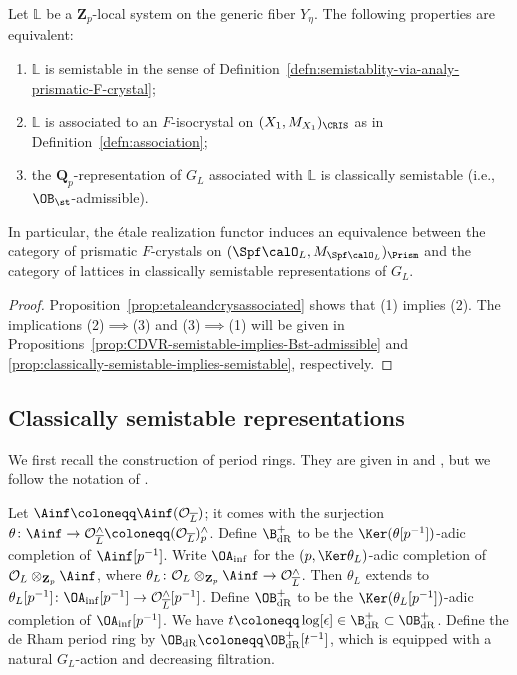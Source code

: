 \begin{thm} \label{thm:CDVR-semistable-notions-equivalent}
Let $\mathbb{L}$ be a $\mathbf{Z}_p$-local system on the generic fiber $Y_{\eta}$. The following properties are equivalent:
\begin{enumerate}
    \item $\mathbb{L}$ is semistable in the sense of Definition~\ref{defn:semistablity-via-analy-prismatic-F-crystal};
    \item $\mathbb{L}$ is associated to an $F$-isocrystal on $(X_1,M_{X_1})_{\CRIS}$ as in Definition~\ref{defn:association};
    \item the $\mathbf{Q}_p$-representation of $G_L$ associated with $\mathbb{L}$ is classically semistable (i.e., $\OB_{\st}$-admissible).
\end{enumerate}
In particular, the \'etale realization functor induces an equivalence between the category of prismatic $F$-crystals on $(\Spf \calO_L, M_{\Spf \calO_L})_\Prism$ and the category of lattices in classically semistable representations of $G_L$.
\end{thm}

\begin{proof}
Proposition~\ref{prop:etaleandcrysassociated} shows that (1) implies (2). The implications (2)$\implies$(3) and (3)$\implies$(1) will be given in Propositions~\ref{prop:CDVR-semistable-implies-Bst-admissible} and \ref{prop:classically-semistable-implies-semistable}, respectively.
\end{proof}

\subsection{Classically semistable representations} \label{sec:classically-semistable}

We first recall the construction of period rings. They are given in \cite{brinon-crys-rep-imperfect-residue} and \cite{Morita-imperfsemistable}, but we follow the notation of \cite{scholze-p-adic-hodge}.

Let $\Ainf \coloneqq \Ainf(\mathcal{O}_{\overline{L}})$; it comes with the surjection $\theta\colon \Ainf \rightarrow \mathcal{O}_{\overline{L}}^{\wedge} \coloneqq (\mathcal{O}_{\overline{L}})^{\wedge}_p$. Define $\B_{\mathrm{dR}}^{+}$ to be the $\Ker(\theta[p^{-1}])$-adic completion of $\Ainf[p^{-1}]$. 
Write $\OA_\mathrm{inf}$ for the $(p,\Ker\theta_L)$-adic completion of $\mathcal{O}_{L}\otimes_{\mathbf{Z}_p} \Ainf$, where $\theta_L\colon \mathcal{O}_{L}\otimes_{\mathbf{Z}_p} \Ainf\rightarrow \mathcal{O}_{\overline{L}}^{\wedge}$. Then $\theta_L$ extends to $\theta_L[p^{-1}]\colon \OA_\mathrm{inf}[p^{-1}]\rightarrow \mathcal{O}_{\overline{L}}^{\wedge}[p^{-1}]$. Define $\OB_{\mathrm{dR}}^{+}$ to be the $\Ker (\theta_L[p^{-1}])$-adic completion of $\OA_\mathrm{inf}[p^{-1}]$. 
We have $t \coloneqq \operatorname{log}[\epsilon] \in \B_{\mathrm{dR}}^{+} \subset \OB_{\mathrm{dR}}^{+}$. Define the de Rham period ring by $\OB_{\mathrm{dR}} \coloneqq \OB_{\mathrm{dR}}^{+}[t^{-1}]$, which is equipped with a natural $G_L$-action and decreasing filtration.


